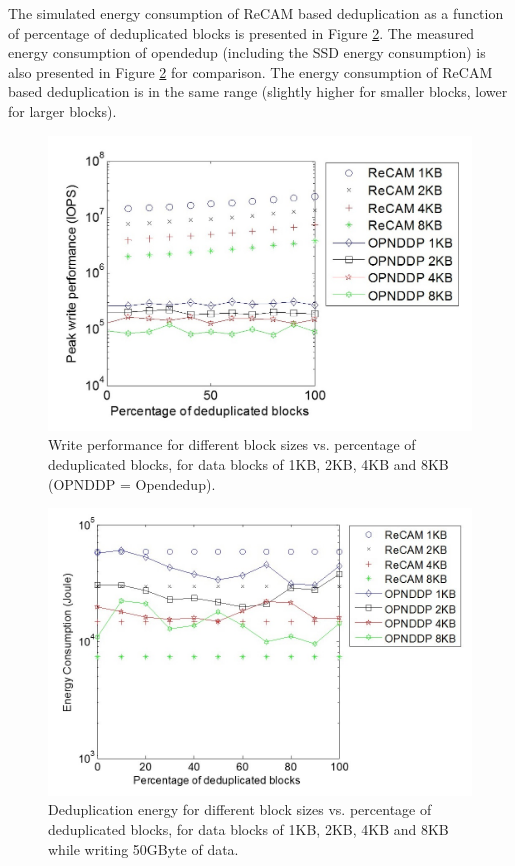 \documentclass{superfri}
\begin{document}
	The simulated energy consumption of ReCAM based deduplication as a function of percentage of deduplicated blocks is presented in Figure \ref{fig:dedup_energy}. The measured energy consumption of opendedup (including the SSD energy consumption) is also presented in Figure \ref{fig:dedup_energy} for comparison. The energy consumption of ReCAM based deduplication is in the same range (slightly higher for smaller blocks, lower for larger blocks).
	
	\begin{figure}[ht!]
		\centerline{\includegraphics[scale=1]{Figures/dedup_perf.jpg}}
		\caption{Write performance for different block sizes vs. percentage of deduplicated blocks, for data blocks of 1KB, 2KB, 4KB and 8KB (OPNDDP = Opendedup).}
		\label{fig:dedup_performance}
	\end{figure}
	
	\begin{figure}[h!]
		\centerline{\includegraphics[scale=1]{Figures/dedup_energy.jpg}}
		\caption{Deduplication energy for different block sizes vs. percentage of deduplicated blocks, for data blocks of 1KB, 2KB, 4KB and 8KB while writing 50GByte of data.}
		\label{fig:dedup_energy}
	\end{figure}
	
\end{document}
